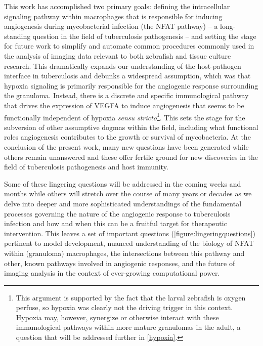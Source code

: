 This work has accomplished two primary goals: defining the intracellular signaling pathway within macrophages that is responsible for inducing angiogenesis during mycobacterial infection (the NFAT pathway) -- a long\hyp{}standing question in the field of tuberculosis pathogenesis -- and setting the stage for future work to simplify and automate common procedures commonly used in the analysis of imaging data relevant to both zebrafish and tissue culture research. This dramatically expands our understanding of the host-pathogen interface in tuberculosis and debunks a widespread assumption, which was that hypoxia signaling is primarily responsible for the angiogenic response surrounding the granuloma. Instead, there is a discrete and specific immunological pathway that drives the expression of VEGFA to induce angiogenesis that seems to be functionally independent of hypoxia \textit{sensu stricto}\footnote{This argument is supported by the fact that the larval zebrafish is oxygen perfuse, so hypoxia was clearly not the driving trigger in this context. Hypoxia may, however, synergize or otherwise interact with these immunological pathways within more mature granulomas in the adult, a question that will be addressed further in \autoref{hypoxia}.}. This sets the stage for the subversion of other assumptive dogmas within the field, including what functional roles angiogenesis contributes to the growth or survival of mycobacteria. At the conclusion of the present work, many new questions have been generated while others remain unanswered and these offer fertile ground for new discoveries in the field of tuberculosis pathogenesis and host immunity. 

Some of these lingering questions will be addressed in the coming weeks and months while others will stretch over the course of many years or decades as we delve into deeper and more sophisticated understandings of the fundamental processes governing the nature of the angiogenic response to tuberculosis infection and how and when this can be a fruitful target for therapeutic intervention. This leaves a set of important questions (\autoref{figure:lingeringquestions}) pertinent to model development, nuanced understanding of the biology of NFAT within (granuloma) macrophages, the intersections between this pathway and other, known pathways involved in angiogenic responses, and the future of imaging analysis in the context of ever\hyp{}growing computational power. 

